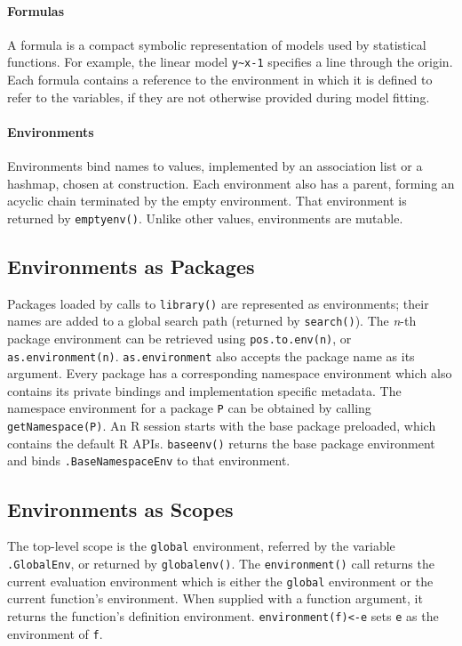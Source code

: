\documentclass[10pt,review,sigplan,anonymous=true,authorversion=true,nonacm=true]{acmart}
\newcommand{\code}[1]{\lstinline |#1|\xspace}
\newcommand{\asEnvironment}{\code{as.environment}}
\begin{document}
\paragraph{Formulas}  A formula is a compact symbolic
representation of models used by statistical functions. For example, the linear
model \code{y~x-1} specifies a line through the origin. Each formula contains a
reference to the environment in which it is defined to refer to the variables,
if they are not otherwise provided during model fitting.

\paragraph{Environments}
Environments bind names to values, implemented by an association list or a
hashmap, chosen at construction. Each environment also has a parent, forming an
acyclic chain terminated by the empty environment. That environment is returned
by \code{emptyenv()}. Unlike other values, environments are mutable.

\subsection{Environments as Packages}

Packages loaded by calls to \code{library()} are represented as environments;
their names are added to a global search path (returned by \code{search()}). The
\emph{n}-th package environment can be retrieved using \code{pos.to.env(n)}, or
\code{as.environment(n)}. \asEnvironment also accepts the package name as its
argument. Every package has a corresponding namespace environment which also
contains its private bindings and implementation specific metadata. The
namespace environment for a package \code{P} can be obtained by calling
\code{getNamespace(P)}. An R session starts with the base package preloaded,
which contains the default R APIs. \code{baseenv()} returns the base package
environment and binds \code{.BaseNamespaceEnv} to that environment.

\subsection{Environments as Scopes}
The top-level scope is the \code{global} environment, referred by the variable
\code{.GlobalEnv}, or returned by \code{globalenv()}. The \code{environment()}
call returns the current evaluation environment which is either the
\code{global} environment or the current function's environment. When supplied
with a function argument, it returns the function's definition environment.
\code{environment(f)<-e} sets \code{e} as the environment of \code{f}.
\end{document}
